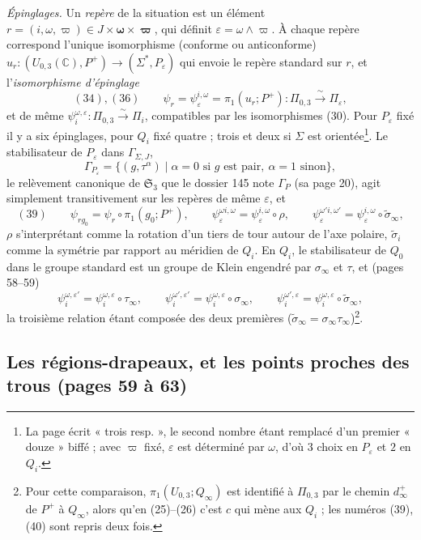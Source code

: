 \documentclass[11pt,a4paper]{article}
\begin{document}
\emph{Épinglages.} Un \emph{repère} de la situation est un élément
$r = (i, \omega, \varpi) \in J \times \boldsymbol{\omega} \times
\boldsymbol{\varpi}$, qui définit $\varepsilon = \omega \wedge \varpi$. À
chaque repère correspond l'unique isomorphisme (conforme ou anticonforme)
$u_r : (U_{0,3}(\mathbb{C}), P^{+}) \to (\Sigma^{*}, P_\varepsilon)$ qui envoie
le repère standard sur $r$, et l'\emph{isomorphisme d'épinglage}
\[
(34),(36)\qquad \psi_r = \psi_\varepsilon^{i,\omega} = \pi_1(u_r; P^{+}) : \Pi_{0,3} \xrightarrow{\ \sim\ } \Pi_\varepsilon ,
\]
et de même $\psi_i^{\omega,\varepsilon} : \Pi_{0,3} \xrightarrow{\sim} \Pi_i$,
compatibles par les isomorphismes (30). Pour $P_\varepsilon$ fixé il y a six
épinglages, pour $Q_i$ fixé quatre ; trois et deux si $\Sigma$ est
orientée\footnote{La page écrit « trois resp. », le second nombre étant
remplacé d'un premier « douze » biffé ; avec $\varpi$ fixé, $\varepsilon$ est
déterminé par $\omega$, d'où $3$ choix en $P_\varepsilon$ et $2$ en $Q_i$.}.
Le stabilisateur de $P_\varepsilon$ dans $\Gamma_{\Sigma,J}$,
\[
\Gamma_{P_\varepsilon} = \{(g, \tau^{\alpha}) \mid \alpha = 0 \text{ si } g \text{ est pair},\ \alpha = 1 \text{ sinon}\},
\]
le relèvement canonique de $\mathfrak{S}_3$ que le dossier 145 note
$\Gamma_P$ (sa page 20), agit simplement transitivement sur les repères de
même $\varepsilon$, et
\[
(39)\qquad \psi_{r g_0} = \psi_r \circ \pi_1(g_0; P^{+}), \qquad
\psi_\varepsilon^{\omega i, \omega} = \psi_\varepsilon^{i,\omega} \circ \rho, \qquad
\psi_\varepsilon^{\omega' i, \omega'} = \psi_\varepsilon^{i,\omega} \circ \tilde\sigma_\infty ,
\]
$\rho$ s'interprétant comme la rotation d'un tiers de tour autour de l'axe
polaire, $\tilde\sigma_i$ comme la symétrie par rapport au méridien de $Q_i$.
En $Q_i$, le stabilisateur de $Q_0$ dans le groupe standard est un groupe de
Klein engendré par $\sigma_\infty$ et $\tau$, et (pages 58–59)
\[
\psi_i^{\omega,\varepsilon'} = \psi_i^{\omega,\varepsilon} \circ \tau_\infty, \qquad
\psi_i^{\omega',\varepsilon'} = \psi_i^{\omega,\varepsilon} \circ \sigma_\infty, \qquad
\psi_i^{\omega',\varepsilon} = \psi_i^{\omega,\varepsilon} \circ \tilde\sigma_\infty ,
\]
la troisième relation étant composée des deux premières
($\tilde\sigma_\infty = \sigma_\infty\tau_\infty$)\footnote{Pour cette
comparaison, $\pi_1(U_{0,3}; Q_\infty)$ est identifié à $\Pi_{0,3}$ par le
chemin $d_\infty^{+}$ de $P^{+}$ à $Q_\infty$, alors qu'en (25)–(26) c'est $c$
qui mène aux $Q_i$ ; les numéros (39), (40) sont repris deux fois.}.

\subsection*{Les régions-drapeaux, et les points proches des trous (pages 59 à 63)}
\end{document}
